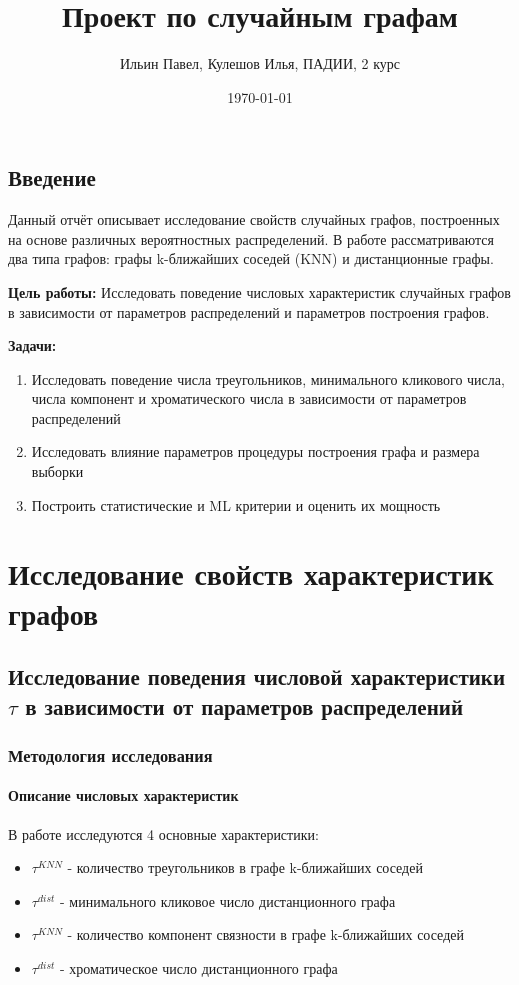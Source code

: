 \documentclass[a4paper,12pt]{report}
\title{Проект по случайным графам}
\author{Ильин Павел, Кулешов Илья, ПАДИИ, 2 курс}
\date{\today}
\begin{document}
\maketitle

\tableofcontents

\chapter*{Введение}

Данный отчёт описывает исследование свойств случайных графов, построенных на основе различных вероятностных распределений. В работе рассматриваются два типа графов: графы k-ближайших соседей (KNN) и дистанционные графы.

\textbf{Цель работы:} Исследовать поведение числовых характеристик случайных графов в зависимости от параметров распределений и параметров построения графов.

\textbf{Задачи:}
\begin{enumerate}
    \item Исследовать поведение числа треугольников, минимального кликового числа, числа компонент и хроматического числа в зависимости от параметров распределений
    \item Исследовать влияние параметров процедуры построения графа и размера выборки
    \item Построить статистические и ML критерии и оценить их мощность
\end{enumerate}

\part{Исследование свойств характеристик графов}

\chapter{Исследование поведения числовой характеристики $\tau$ в зависимости от параметров распределений}

\section{Методология исследования}

\subsection{Описание числовых характеристик}
В работе исследуются 4 основные характеристики:
\begin{itemize}
    \item $\tau^{KNN}$ - количество треугольников в графе k-ближайших соседей
    \item $\tau^{dist}$ - минимального кликовое число дистанционного графа
    \item $\tau^{KNN}$ - количество компонент связности в графе k-ближайших соседей
    \item $\tau^{dist}$ - хроматическое число дистанционного графа
\end{itemize}
\end{document}
